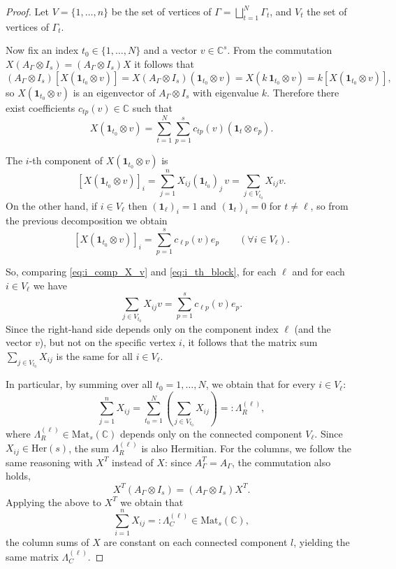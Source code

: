 \documentclass[11pt, a4paper]{article}
\theoremstyle{plain}
\theoremstyle{definition}
\theoremstyle{remark}
\begin{document}
\begin{proof}

Let \(V=\{1,\dots,n\}\) be the set of vertices of \(\Gamma=\bigsqcup_{t=1}^N\Gamma_t\),
and \(V_t\) the set of vertices of \(\Gamma_t\).

Now fix an index \(t_0\in\{1,\dots,N\}\) and a vector \(v \in\mathbb C^s\).
From the commutation \(X(A_\Gamma\otimes I_s)=(A_\Gamma\otimes I_s)X\) it follows that
\[
(A_\Gamma\otimes I_s) \left[ X(\mathbf 1_{t_0}\otimes v) \right]
=
X(A_\Gamma\otimes I_s)(\mathbf 1_{t_0}\otimes v)
=
X(k\,\mathbf 1_{t_0}\otimes v)
=
k \left[ X(\mathbf 1_{t_0}\otimes v) \right],
\]
so \(X(\mathbf 1_{t_0}\otimes v)\) is an eigenvector of \(A_\Gamma\otimes I_s\) with eigenvalue \(k\). Therefore there exist coefficients \(c_{tp}(v) \in \mathbb{C}\) such that
\[
X(\mathbf 1_{t_0}\otimes v) = \sum_{t=1}^N \sum_{p=1}^s c_{tp}(v) (\mathbf 1_t \otimes e_p).
\]

The \(i\)-th component of \(X(\mathbf 1_{t_0}\otimes v)\) is
\begin{equation}\label{eq:i_comp_X_v}
    \left[ X(\mathbf 1_{t_0}\otimes v) \right]_i
=
\sum_{j=1}^n X_{ij}(\mathbf 1_{t_0})_j\, v
=
\sum_{j\in V_{t_0}} X_{ij} v.
\end{equation}
On the other hand, if \(i\in V_\ell\) then \((\mathbf 1_\ell)_i=1\) and \((\mathbf 1_t)_i=0\) for \(t\neq \ell\), so from the previous decomposition we obtain
\begin{equation}\label{eq:i_th_block}
\left[ X(\mathbf 1_{t_0}\otimes v) \right]_i = \sum_{p=1}^s c_{\ell p}(v) e_p \qquad (\forall i\in V_\ell).
\end{equation}

So, comparing \eqref{eq:i_comp_X_v} and \eqref{eq:i_th_block}, for each \(\ell\) and for each \(i\in V_\ell\) we have
\[
\sum_{j\in V_{t_0}} X_{ij} v = \sum_{p=1}^s c_{\ell p}(v) e_p.
\]
Since the right-hand side depends only on the component index \(\ell\) (and the vector \(v\)), but not on the specific vertex \(i\), it follows that the matrix sum \(\sum_{j\in V_{t_0}} X_{ij}\) is the same for all \(i \in V_\ell\). 

In particular, by summing over all \(t_0=1,\dots,N\), we obtain that for every \(i \in V_\ell\):
\[
\sum_{j=1}^n X_{ij} = \sum_{t_0=1}^N \left( \sum_{j\in V_{t_0}} X_{ij} \right) =: \Lambda^{(\ell)}_{R},
\]
where \(\Lambda^{(\ell)}_{R}\in \mathrm{Mat}_s(\mathbb C)\) depends only on the connected component \(V_\ell\). 
Since \(X_{ij} \in \mathrm{Her}(s)\), the sum \(\Lambda^{(\ell)}_{R}\) is also Hermitian.
For the columns, we follow the same reasoning with \(X^T\) instead of \(X\):
since \(A_\Gamma^T=A_\Gamma\), the commutation also holds,
\[
X^T(A_\Gamma\otimes I_s)=(A_\Gamma\otimes I_s)X^T.
\]
Applying the above to \(X^T\) we obtain that 
\[
\sum_{i=1}^n X_{ij}
=:\Lambda^{(\ell)}_{C}\in \mathrm{Mat}_s(\mathbb C),
\]
the column sums of \(X\) are constant on each connected component \(l\), yielding the same matrix \(\Lambda^{(\ell)}_{C}\).
\end{proof}
\end{document}
